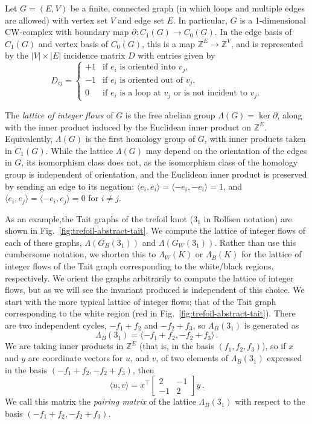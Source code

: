 \documentclass[12pt]{report}
\newcommand{\Z}{\mathbb{Z}}
\newcommand{\ip}[2]{\langle #1, #2 \rangle}
\begin{document}
Let $G = (E, V)$ be a finite, connected graph (in which loops and multiple edges are allowed) with vertex set $V$ and edge set $E$. In particular, $G$ is a 1-dimensional CW-complex with boundary map $\partial: C_{1}(G) \longrightarrow C_{0}(G)$. In the edge basis of $C_{1}(G)$ and vertex basis of $C_{0}(G)$, this is a map $\Z^{E} \longrightarrow \Z^{V}$, and is represented by the $|V|\times|E|$ incidence matrix $D$ with entries given by
\[D_{ij} = \begin{cases}
	+1 & \text{if $e_{i}$ is oriented into $v_{j}$,}   \\
	-1 & \text{if $e_{i}$ is oriented out of $v_{j}$,} \\
	0  & \text{if $e_{i}$ is a loop at $v_{j}$ or is not incident to $v_{j}$.}
\end{cases}\]

The \textit{lattice of integer flows} of $G$ is the free abelian group $\Lambda(G) = \ker \partial$, along with the inner product induced by the Euclidean inner product on $\Z^{E}$. Equivalently, $\Lambda(G)$ is the first homology group of $G$, with inner products taken in $C_{1}(G)$. While the lattice $\Lambda(G)$ may depend on the orientation of the edges in $G$, its isomorphism class does not, as the isomorphism class of the homology group is independent of orientation, and the Euclidean inner product is preserved by sending an edge to its negation: $\ip{e_{i}}{e_{i}} =  \ip{-e_{i}}{-e_{i}} = 1$, and $\ip{e_{i}}{e_{j}} = \ip{-e_{i}}{e_{j}} = 0$ for $i \neq j$.

As an example,the Tait graphs of the trefoil knot ($3_{1}$ in Rolfsen notation) are shown in Fig.~\ref{fig:trefoil-abstract-tait}. We compute the lattice of integer flows of each of these graphs, $\Lambda(G_{B}(3_{1}))$ and $\Lambda(G_W(3_{1}))$. Rather than use this cumbersome notation, we shorten this to $\Lambda_{W}(K)$ or $\Lambda_{B}(K)$ for the lattice of integer flows of the Tait graph corresponding to the white/black regions, respectively. We orient the graphs arbitrarily to compute the lattice of integer flows, but as we will see the invariant produced is independent of this choice. We start with the more typical lattice of integer flows: that of the Tait graph corresponding to the white region (red in Fig.~\ref{fig:trefoil-abstract-tait}). There are two independent cycles, $-f_{1} + f_{2}$ and $-f_{2} + f_{3}$, so $\Lambda_{B}(3_{1})$ is generated as
\[\Lambda_{B}(3_{1}) = \langle -f_{1} + f_{2}, -f_{2} + f_{3} \rangle\,.\]
We are taking inner products in $\Z^{E}$ (that is, in the basis $(f_{1}, f_{2}, f_{3})$), so if $x$ and $y$ are coordinate vectors for $u$, and $v$, of two elements of $\Lambda_{B}(3_{1})$ expressed in the basis $(-f_{1} + f_{2}, -f_{2} + f_{3})$, then
\[\langle u, v \rangle = x^{\top}\begin{bmatrix}
	2  & -1 \\
	-1 & 2
\end{bmatrix}y\,.\]
We call this matrix the \textit{pairing matrix} of the lattice $\Lambda_{B}(3_{1})$ with respect to the basis ${(-f_{1} + f_{2}, -f_{2} + f_{3})}$.
\end{document}

